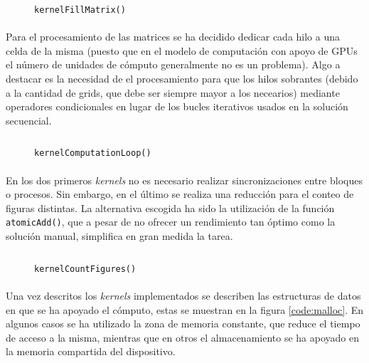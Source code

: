 \documentclass[10pt, a4paper,spanish]{article}
\begin{document}
		\begin{figure}[h]
			\centering
			\inputminted{cuda}{./code/k1.cu}
			\caption{\texttt{kernelFillMatrix()}}
			\label{code:k1}
		\end{figure}

		\paragraph{}
		Para el procesamiento de las matrices se ha decidido dedicar cada hilo a una celda de la misma (puesto que en el modelo de computación con apoyo de GPUs el número de unidades de cómputo generalmente no es un problema). Algo a destacar es la necesidad de  el procesamiento para que los hilos sobrantes (debido a la cantidad de grids, que debe ser siempre mayor a los necearios) mediante operadores condicionales en lugar de los bucles iterativos usados en la solución secuencial.


		\begin{figure}[h]
			\centering
			\inputminted{cuda}{./code/k2.cu}
			\caption{\texttt{kernelComputationLoop()}}
			\label{code:k2}
		\end{figure}

		\paragraph{}
		En los dos primeros \emph{kernels} no es necesario realizar sincronizaciones entre bloques o procesos. Sin embargo, en el último se realiza una reducción para el conteo de figuras distintas. La alternativa escogida ha sido la utilización de la función \texttt{atomicAdd()}, que a pesar de no ofrecer un rendimiento tan óptimo como la solución manual, simplifica en gran medida la tarea.

		\begin{figure}[h]
			\centering
			\inputminted{cuda}{./code/k3.cu}
			\caption{\texttt{kernelCountFigures()}}
			\label{code:k3}
		\end{figure}

		\paragraph{}
		Una vez descritos los \emph{kernels} implementados se describen las estructuras de datos en que se ha apoyado el cómputo, estas se muestran en la figura \ref{code:malloc}. En algunos casos se ha utilizado la zona de memoria constante, que reduce el tiempo de acceso a la misma, mientras que en otros el almacenamiento se ha apoyado en la memoria compartida del dispositivo.
\end{document}
